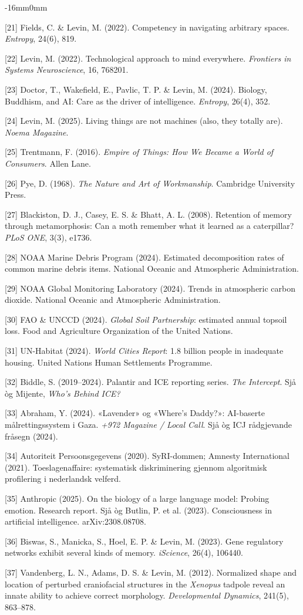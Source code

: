 \documentclass[10pt,oneside]{book}
\newcommand{\refentry}[1]{%
  \par\addvspace{0pt}%
  \begingroup\footnotesize\linespread{0.92}\selectfont
  \noindent\hangindent=4mm\hangafter=1 #1\par%
  \endgroup
}
\newenvironment{widebody}{%
  \begin{adjustwidth}{-16mm}{0mm}%
}{%
  \end{adjustwidth}%
}
\begin{document}
\begin{widebody}
\refentry{[21] Fields, C. \& Levin, M. (2022). Competency in navigating arbitrary spaces. \textit{Entropy}, 24(6), 819.}
\refentry{[22] Levin, M. (2022). Technological approach to mind everywhere. \textit{Frontiers in Systems Neuroscience}, 16, 768201.}
\refentry{[23] Doctor, T., Wakefield, E., Pavlic, T. P. \& Levin, M. (2024). Biology, Buddhism, and AI: Care as the driver of intelligence. \textit{Entropy}, 26(4), 352.}
\refentry{[24] Levin, M. (2025). Living things are not machines (also, they totally are). \textit{Noema Magazine}.}
\refentry{[25] Trentmann, F. (2016). \textit{Empire of Things: How We Became a World of Consumers}. Allen Lane.}
\refentry{[26] Pye, D. (1968). \textit{The Nature and Art of Workmanship}. Cambridge University Press.}
\refentry{[27] Blackiston, D. J., Casey, E. S. \& Bhatt, A. L. (2008). Retention of memory through metamorphosis: Can a moth remember what it learned as a caterpillar? \textit{PLoS ONE}, 3(3), e1736.}
\refentry{[28] NOAA Marine Debris Program (2024). Estimated decomposition rates of common marine debris items. National Oceanic and Atmospheric Administration.}
\refentry{[29] NOAA Global Monitoring Laboratory (2024). Trends in atmospheric carbon dioxide. National Oceanic and Atmospheric Administration.}
\refentry{[30] FAO \& UNCCD (2024). \textit{Global Soil Partnership}: estimated annual topsoil loss. Food and Agriculture Organization of the United Nations.}
\refentry{[31] UN-Habitat (2024). \textit{World Cities Report}: 1.8 billion people in inadequate housing. United Nations Human Settlements Programme.}
\refentry{[32] Biddle, S. (2019--2024). Palantir and ICE reporting series. \textit{The Intercept}. Sjå òg Mijente, \textit{Who's Behind ICE?}}
\refentry{[33] Abraham, Y. (2024). «Lavender» og «Where's Daddy?»: AI-baserte målrettingssystem i Gaza. \textit{+972 Magazine / Local Call}. Sjå òg ICJ rådgjevande fråsegn (2024).}
\refentry{[34] Autoriteit Persoonsgegevens (2020). SyRI-dommen; Amnesty International (2021). Toeslagenaffaire: systematisk diskriminering gjennom algoritmisk profilering i nederlandsk velferd.}
\refentry{[35] Anthropic (2025). On the biology of a large language model: Probing emotion. Research report. Sjå òg Butlin, P. et al. (2023). Consciousness in artificial intelligence. arXiv:2308.08708.}
\refentry{[36] Biswas, S., Manicka, S., Hoel, E. P. \& Levin, M. (2023). Gene regulatory networks exhibit several kinds of memory. \textit{iScience}, 26(4), 106440.}
\refentry{[37] Vandenberg, L. N., Adams, D. S. \& Levin, M. (2012). Normalized shape and location of perturbed craniofacial structures in the \textit{Xenopus} tadpole reveal an innate ability to achieve correct morphology. \textit{Developmental Dynamics}, 241(5), 863--878.}

\end{widebody}
\end{document}
